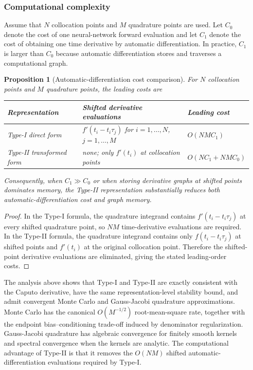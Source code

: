 \documentclass[preprint,3p,times]{elsarticle}
\newtheorem{proposition}{Proposition}[section]
\begin{document}
\subsubsection{Computational complexity}

Assume that $N$ collocation points and $M$ quadrature points are used. Let $C_0$ denote the cost of one neural-network forward evaluation and let $C_1$ denote the cost of obtaining one time derivative by automatic differentiation. In practice, $C_1$ is larger than $C_0$ because automatic differentiation stores and traverses a computational graph.

\begin{proposition}[Automatic-differentiation cost comparison]
\label{prop:complexity}
For $N$ collocation points and $M$ quadrature points, the leading costs are
\begin{center}
\begin{tabular}{lll}
\hline
Representation & Shifted derivative evaluations & Leading cost \\
\hline
Type-I direct form & $f'(t_i-t_i\tau_j)$ for $i=1,\ldots,N$, $j=1,\ldots,M$ & $O(NM C_1)$ \\
Type-II transformed form & none; only $f'(t_i)$ at collocation points & $O(N C_1+NM C_0)$ \\
\hline
\end{tabular}
\end{center}
Consequently, when $C_1\gg C_0$ or when storing derivative graphs at shifted points dominates memory, the Type-II representation substantially reduces both automatic-differentiation cost and graph memory.
\end{proposition}

\begin{proof}
In the Type-I formula, the quadrature integrand contains $f'(t_i-t_i\tau_j)$ at every shifted quadrature point, so $NM$ time-derivative evaluations are required. In the Type-II formula, the quadrature integrand contains only $f(t_i-t_i\tau_j)$ at shifted points and $f'(t_i)$ at the original collocation point. Therefore the shifted-point derivative evaluations are eliminated, giving the stated leading-order costs.
\end{proof}

The analysis above shows that Type-I and Type-II are exactly consistent with the Caputo derivative, have the same representation-level stability bound, and admit convergent Monte Carlo and Gauss-Jacobi quadrature approximations. Monte Carlo has the canonical $O(M^{-1/2})$ root-mean-square rate, together with the endpoint bias--conditioning trade-off induced by denominator regularization. Gauss-Jacobi quadrature has algebraic convergence for finitely smooth kernels and spectral convergence when the kernels are analytic. The computational advantage of Type-II is that it removes the $O(NM)$ shifted automatic-differentiation evaluations required by Type-I.
\endgroup
\end{document}
